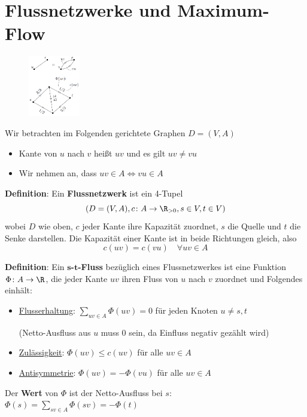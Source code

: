 \section{Flussnetzwerke und Maximum-Flow}

\begin{figure}
	\centering
	\vspace{-20pt}
	\includegraphics[width=0.2\textwidth]{images/fnet.png}
	\vspace{40pt}
	\vspace{-800pt}
\end{figure}

Wir betrachten im Folgenden gerichtete Graphen $D=(V,A)$
\begin{itemize}
	\item Kante von $u$ nach $v$ heißt $uv$ und es gilt $uv\neq vu$
	\item Wir nehmen an, dass $uv\in A\iff vu\in A$
\end{itemize}
\bigskip
\textbf{Definition}: Ein \textbf{Flussnetzwerk} ist ein 4-Tupel $$(D=(V, A), c\colon A\rightarrow \R_{>0}, s\in V, t\in V )$$ wobei $D$ wie oben, $c$ jeder Kante ihre Kapazität zuordnet, $s$ die Quelle und $t$ die Senke darstellen. Die Kapazität einer Kante ist in beide Richtungen gleich, also $$c(uv)=c(vu)\quad \forall uv\in A$$

\textbf{Definition}: Ein \textbf{$\boldsymbol{s}$-$\boldsymbol{t}$-Fluss} bezüglich eines Flussnetzwerkes ist eine Funktion $\Phi\colon A\rightarrow\R$, die jeder Kante $uv$ ihren Fluss von $u$ nach $v$ zuordnet und Folgendes einhält: 
\begin{itemize}
	\item \underline{Flusserhaltung}: $\sum\limits_{uv\in A}\Phi(uv)=0$ für jeden Knoten $u\neq s,t$
	
	(Netto-Ausfluss aus $u$ muss 0 sein, da Einfluss negativ gezählt wird)
	\item \underline{Zulässigkeit}: $\Phi(uv)\leq c(uv)$ für alle $uv\in A$
	\item \underline{Antisymmetrie}: $\Phi(uv)=-\Phi(vu)$ für alle $uv\in A$
\end{itemize}
Der \textbf{Wert} von $\Phi$ ist der Netto-Ausfluss bei $s$: $\Phi(s)=\sum\limits_{sv\in A}\Phi(sv)=-\Phi(t)$

